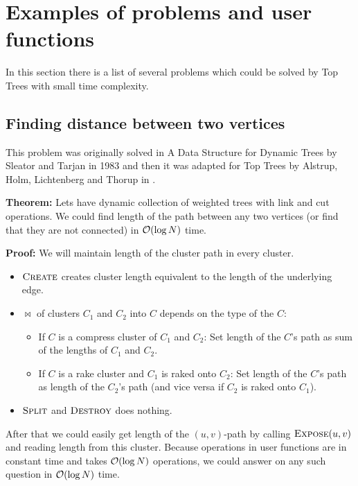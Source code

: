 \chapter{Examples of problems and user functions}
\label{chap:Problems}

In this section there is a list of several problems which could be solved by
Top Trees with small time complexity.

\section{Finding distance between two vertices}

This problem was originally solved in {\I A Data Structure for Dynamic Trees}
\cite{DSforDynamicTrees} by Sleator and Tarjan in 1983 and then it was adapted
for Top Trees by Alstrup, Holm, Lichtenberg and Thorup in \cite{TopTrees}.

{\bf Theorem:} Lets have dynamic collection of weighted trees with link and cut
operations. We could find length of the path between any two vertices (or find
that they are not connected) in ${\cal O}(\log N)$ time.

\medskip\noindent
{\bf Proof:} We will maintain length of the cluster path in every cluster.

\begin{itemize}

\item $\hbox{\sc Create}$ creates cluster length equivalent to the length of the
underlying edge.

\item $\Join$ of clusters $C_1$ and $C_2$ into $C$ depends on the type of the $C$:
	\begin{itemize}
	\item If $C$ is a compress cluster of $C_1$ and $C_2$:
	Set length of the $C$'s path as sum of the lengths of $C_1$ and $C_2$.
	\item If $C$ is a rake cluster and $C_1$ is raked onto $C_2$:
	Set length of the $C$'s path as length of the $C_2$'s path (and vice
	versa if $C_2$ is raked onto $C_1$).
	\end{itemize}

\item $\hbox{\sc Split}$ and $\hbox{\sc Destroy}$ does nothing.

\end{itemize}

After that we could easily get length of the $(u,v)$-path by calling
$\hbox{\sc Expose}(u,v)$ and reading length from this cluster. Because operations
in user functions are in constant time and \Expose{} takes ${\cal O}(\log N)$
operations, we could answer on any such question in ${\cal O}(\log N)$ time.

